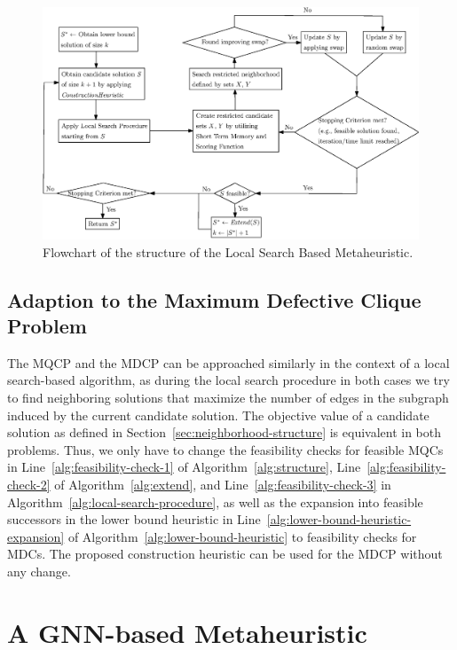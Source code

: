\documentclass[draft,final]{vutinfth} %
\begin{document}
\begin{figure}
    \centering
    \includegraphics[width=\textwidth]{graphics/flowchart_local_search_algorithm.eps}
    \caption{Flowchart of the structure of the Local Search Based Metaheuristic.}
    \label{fig:flowchart-local-search-algorithm}
\end{figure}
 
\section{Adaption to the Maximum Defective Clique Problem}\label{sec:adaption-to-mdcp}
The MQCP and the MDCP can be approached similarly in the context of a local search-based algorithm, as during the local search procedure in both cases we try to find neighboring solutions that maximize the number of edges in the subgraph induced by the current candidate solution. The objective value of a candidate solution as defined in Section~\ref{sec:neighborhood-structure} is equivalent in both problems. Thus, we only have to change the feasibility checks for feasible MQCs in Line~\ref{alg:feasibility-check-1} of Algorithm~\ref{alg:structure}, Line~\ref{alg:feasibility-check-2} of Algorithm~\ref{alg:extend}, and Line~\ref{alg:feasibility-check-3} in Algorithm~\ref{alg:local-search-procedure}, as well as the expansion into feasible successors in the lower bound heuristic in Line~\ref{alg:lower-bound-heuristic-expansion} of Algorithm~\ref{alg:lower-bound-heuristic} to feasibility checks for MDCs. The proposed construction heuristic can be used for the MDCP without any change.  

\chapter{A GNN-based Metaheuristic}\label{chp:gnn}
\end{document}
